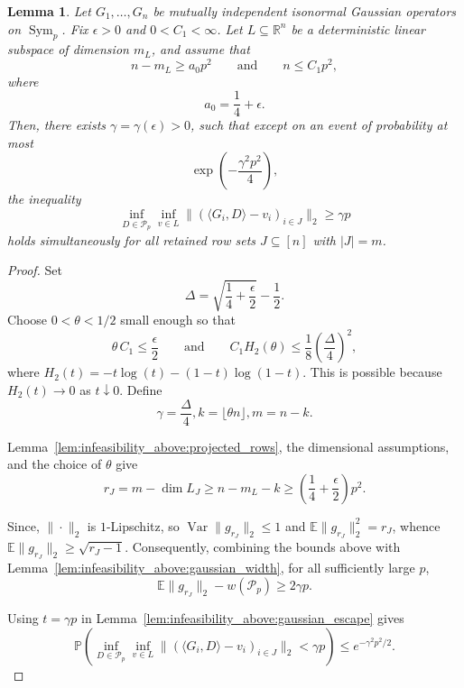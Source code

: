 \documentclass[11pt]{article}
\numberwithin{equation}{section}
\newtheorem{lemma}[theorem]{Lemma}
\theoremstyle{definition}
\theoremstyle{remark}
\newcommand{\E}{\mathbb E}
\newcommand{\Pp}{\mathbb P}
\newcommand{\1}{\boldsymbol 1}
\begin{document}
\begin{aiblock}
\begin{lemma} \label{lem:infeasibility_above:dimensionality_bounds}
    Let $G_1, \dots, G_n$ be mutually independent isonormal Gaussian operators on $\operatorname{Sym}_p$.
    Fix $\epsilon > 0$ and $0 < C_1 < \infty$.
    Let $L \subseteq \mathbb R^n$ be a deterministic linear subspace of dimension $m_L$, and assume that
    \[
        n - m_L \ge a_0 p^2
        \qquad
        \text{and}
        \qquad
        n \le C_1 p^2,
    \]
    where
    \[
        a_0 = \frac{1}{4} + \epsilon.
    \]
    Then, there exists $\gamma = \gamma(\epsilon) > 0$, such that except on an event of probability at most
    \[
        \exp\left(-\frac{\gamma^2 p^2}{4}\right),
    \]
    the inequality
    \[
        \inf_{D \in \mathcal P_p} \inf_{v \in L} \|(\langle G_i, D\rangle - v_i)_{i \in J}\|_2 \ge\gamma p
    \]
    holds simultaneously for all retained row sets $J \subseteq [n]$ with $|J| = m$.
\end{lemma}

\begin{proof}
    Set
    \[
        \Delta = \sqrt{\frac{1}{4} + \frac{\epsilon}{2}} - \frac{1}{2}.
    \]
    Choose $0 < \theta < 1/2$ small enough so that
    \[
        \theta \, C_1 \le \frac{\epsilon}{2}
        \qquad \text{and} \qquad
        C_1 H_2(\theta) \le \frac{1}{8}\left(\frac{\Delta}{4}\right)^2,
    \]
    where $H_2(t) = -t \log(t) - (1 - t) \log(1 - t)$. This is possible because $H_2(t) \to 0$ as $t \downarrow 0$. Define
    \[
        \gamma = \frac{\Delta}{4}, k = \lfloor\theta n\rfloor, m = n - k.
    \]
    
    Lemma~\ref{lem:infeasibility_above:projected_rows}, the dimensional assumptions, and the choice of $\theta$ give
    \[
        r_J = m - \dim L_J \ge n - m_L - k \ge \left(\frac{1}{4} + \frac{\epsilon}{2}\right)p^2.
    \]
    
    Since, $\|\cdot\|_{2}$ is $1$-Lipschitz, so $\operatorname{Var}\|g_{r_J}\|_{2} \le 1$ and $\E\|g_{r_J}\|_{2}^{2} = r_J$, whence $\E\|g_{r_J}\|_{2} \ge \sqrt{r_J - 1}$.
    Consequently, combining the bounds above with Lemma~\ref{lem:infeasibility_above:gaussian_width}, for all sufficiently large $p$,
    \[
        \E\|g_{r_J}\|_2 - w(\mathcal P_p) \ge 2 \gamma p.
    \]
    
    Using $t = \gamma p$ in Lemma~\ref{lem:infeasibility_above:gaussian_escape} gives
    \[
        \Pp\left( \inf_{D \in \mathcal P_p}\inf_{v \in L} \|(\langle G_i, D\rangle - v_i)_{i \in J}\|_2 < \gamma p \right) \le e^{-\gamma^2 p^2 / 2}.
    \]
    

\end{proof}
\end{aiblock}
\end{document}
